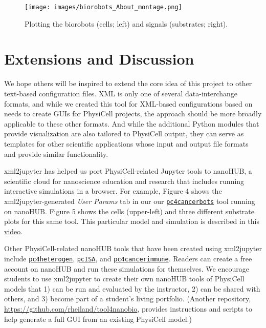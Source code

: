 \documentclass[10pt,letterpaper]{article}
\begin{document}
\begin{figure}
\centering
\texttt{[image: images/biorobots\_About\_montage.png]}
\caption{Plotting the biorobots (cells; left) and signals (substrates;
right).}
\end{figure}

\section*{Extensions and Discussion}

We hope others will be inspired to extend the core idea of this project
to other text-based configuration files. XML is only one of several
data-interchange formats, and while we
created this tool for XML-based configurations based on needs to create
GUIs for PhysiCell projects, the approach should be more broadly
applicable to these other formats. And while the additional Python
modules that provide visualization are also tailored to PhysiCell
output, they can serve as templates for other scientific applications
whose input and output file formats and provide similar functionality.

xml2jupyter has helped us port PhysiCell-related Jupyter tools to
nanoHUB, a scientific cloud for nanoscience education and research that
includes running interactive simulations in a browser. For example,
Figure 4 shows the xml2jupyter-generated \emph{User Params} tab in our
our
\href{https://nanohub.org/tools/pc4cancerbots}{\texttt{pc4cancerbots}}
tool running on nanoHUB. Figure 5 shows the cells (upper-left) and three
different substrate plots for this same tool. This particular model and
simulation is described in this
\href{https://www.youtube.com/watch?v=wuDZ40jW__M}{video}.

Other PhysiCell-related nanoHUB tools that have been created using
xml2jupyter include
\href{https://nanohub.org/tools/pc4heterogen}{\texttt{pc4heterogen}},
\href{https://nanohub.org/tools/pcisa}{\texttt{pcISA}}, and
\href{https://nanohub.org/tools/pc4cancerimmune}{\texttt{pc4cancerimmune}}.
Readers can create a free account on nanoHUB and run these simulations
for themselves. We encourage students to use xml2jupyter to create their
own nanoHUB tools of PhysiCell models that 1) can be run and evaluated
by the instructor, 2) can be shared with others, and 3) become part of a
student's living portfolio. (Another repository,
\url{https://github.com/rheiland/tool4nanobio}, provides instructions
and scripts to help generate a full GUI from an existing PhysiCell
model.)
\end{document}
